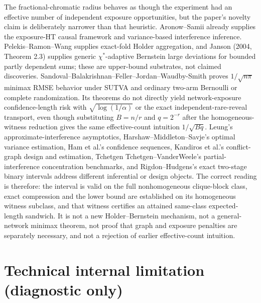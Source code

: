 \documentclass{article}
\begin{document}
The fractional-chromatic radius behaves as though the experiment had an effective number of independent exposure opportunities, but the paper's novelty claim is deliberately narrower than that heuristic. Aronow--Samii already supplies the exposure-HT causal framework and variance-based interference inference. Pelekis--Ramon--Wang supplies exact-fold Holder aggregation, and Janson (2004, Theorem 2.3) supplies generic \(\chi^*\)-adaptive Bernstein large deviations for bounded partly dependent sums; these are upper-bound substrates, not claimed discoveries. Sandoval--Balakrishnan--Feller--Jordan--Waudby-Smith proves \(1/\sqrt{n\pi}\) minimax RMSE behavior under SUTVA and ordinary two-arm Bernoulli or complete randomization. Its theorems do not directly yield network-exposure confidence-length risk with \(\sqrt{\log(1/\alpha)}\) or the exact independent-rare-reveal transport, even though substituting \(B=n/r\) and \(q=2^{-r}\) after the homogeneous-witness reduction gives the same effective-count intuition \(1/\sqrt{Bq}\). Leung's approximate-interference asymptotics, Harshaw--Middleton--Savje's optimal variance estimation, Ham et al.'s confidence sequences, Kandiros et al.'s conflict-graph design and estimation, Tchetgen Tchetgen--VanderWeele's partial-interference concentration benchmarks, and Rigdon--Hudgens's exact two-stage binary intervals address different inferential or design objects. The correct reading is therefore: the interval is valid on the full nonhomogeneous clique-block class, exact compression and the lower bound are established on its homogeneous witness subclass, and that witness certifies an attained same-class expected-length sandwich. It is not a new Holder--Bernstein mechanism, not a general-network minimax theorem, not proof that graph and exposure penalties are separately necessary, and not a rejection of earlier effective-count intuition.

\section*{Technical internal limitation (diagnostic only)}
\end{document}
